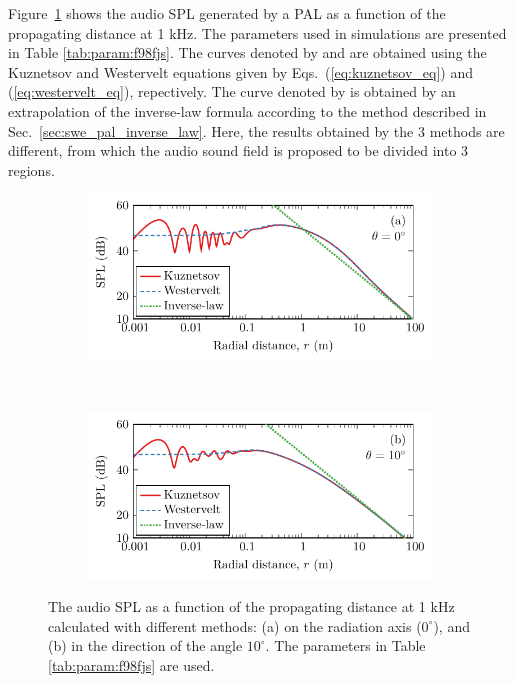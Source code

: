 Figure~\ref{fig:soundfields:289f} shows the audio SPL generated by a PAL as a function of the propagating distance at 1 kHz. 
The parameters used in simulations are presented in Table \ref{tab:param:f98fjs}.
The curves denoted by  and  are obtained using the Kuznetsov and Westervelt equations given by Eqs.~(\ref{eq:kuznetsov_eq}) and (\ref{eq:westervelt_eq}), repectively.
The curve denoted by  is obtained by an extrapolation of the inverse-law formula according to the method described in Sec.~\ref{sec:swe_pal_inverse_law}.
Here, the results obtained by the 3 methods are different, from which the audio sound field is proposed to be divided into 3 regions.

\begin{figure}[htb]
    \centering
    \begin{subfigure}{0.7\textwidth}
        \centering
        \includegraphics[width = \textwidth]{fig/fullfield_a0p05_ultra40e3_audio1000_angle0_200802H.pdf}
    \end{subfigure}
    \\
    \begin{subfigure}{0.7\textwidth}
        \centering
        \includegraphics[width = \textwidth]{fig/fullfield_a0p05_ultra40e3_audio1000_angle10_200802J.pdf}
    \end{subfigure}
    \caption{The audio SPL  as a function of the propagating distance at 1 kHz calculated with different methods: (a) on the radiation axis ($0^\circ$), and (b) in the direction of the angle $10^\circ$. 
    The parameters in Table \ref{tab:param:f98fjs} are used.}
    \label{fig:soundfields:289f}
\end{figure}

